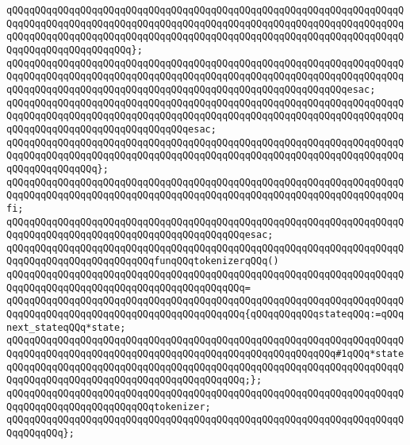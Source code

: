 \verb|qQQqqQQqqQQqqQQqqQQqqQQqqQQqqQQqqQQqqQQqqQQqqQQqqQQqqQQqqQQqqQQqqQQqqQQqqQQqqQQqqQQqqQQqqQQqqQQqqQQqqQQqqQQqqQQqqQQqqQQqqQQqqQQqqQQqqQQqqQQqqQQqqQQqqQQqqQQqqQQqqQQqqQQqqQQqqQQqqQQqqQQqqQQqqQQqqQQqqQQqqQQqqQQqqQQqqQQqqQQqqQQqqQQqqQQq};|\newline
\verb|qQQqqQQqqQQqqQQqqQQqqQQqqQQqqQQqqQQqqQQqqQQqqQQqqQQqqQQqqQQqqQQqqQQqqQQqqQQqqQQqqQQqqQQqqQQqqQQqqQQqqQQqqQQqqQQqqQQqqQQqqQQqqQQqqQQqqQQqqQQqqQQqqQQqqQQqqQQqqQQqqQQqqQQqqQQqqQQqqQQqqQQqqQQqqQQqqQQqqQQqesac;|\newline
\verb|qQQqqQQqqQQqqQQqqQQqqQQqqQQqqQQqqQQqqQQqqQQqqQQqqQQqqQQqqQQqqQQqqQQqqQQqqQQqqQQqqQQqqQQqqQQqqQQqqQQqqQQqqQQqqQQqqQQqqQQqqQQqqQQqqQQqqQQqqQQqqQQqqQQqqQQqqQQqqQQqqQQqqQQqqQQqesac;|\newline
\verb|qQQqqQQqqQQqqQQqqQQqqQQqqQQqqQQqqQQqqQQqqQQqqQQqqQQqqQQqqQQqqQQqqQQqqQQqqQQqqQQqqQQqqQQqqQQqqQQqqQQqqQQqqQQqqQQqqQQqqQQqqQQqqQQqqQQqqQQqqQQqqQQqqQQqqQQqqQQq};|\newline
\verb|qQQqqQQqqQQqqQQqqQQqqQQqqQQqqQQqqQQqqQQqqQQqqQQqqQQqqQQqqQQqqQQqqQQqqQQqqQQqqQQqqQQqqQQqqQQqqQQqqQQqqQQqqQQqqQQqqQQqqQQqqQQqqQQqqQQqqQQqqQQqfi;|\newline
\verb|qQQqqQQqqQQqqQQqqQQqqQQqqQQqqQQqqQQqqQQqqQQqqQQqqQQqqQQqqQQqqQQqqQQqqQQqqQQqqQQqqQQqqQQqqQQqqQQqqQQqqQQqqQQqqQQqesac;|\newline
\newline
\verb|qQQqqQQqqQQqqQQqqQQqqQQqqQQqqQQqqQQqqQQqqQQqqQQqqQQqqQQqqQQqqQQqqQQqqQQqqQQqqQQqqQQqqQQqqQQqqQQqfunqQQqtokenizerqQQq()|\newline
\verb|qQQqqQQqqQQqqQQqqQQqqQQqqQQqqQQqqQQqqQQqqQQqqQQqqQQqqQQqqQQqqQQqqQQqqQQqqQQqqQQqqQQqqQQqqQQqqQQqqQQqqQQqqQQqqQQq=|\newline
\verb|qQQqqQQqqQQqqQQqqQQqqQQqqQQqqQQqqQQqqQQqqQQqqQQqqQQqqQQqqQQqqQQqqQQqqQQqqQQqqQQqqQQqqQQqqQQqqQQqqQQqqQQqqQQqqQQq{qQQqqQQqqQQqstateqQQq:=qQQqnext_stateqQQq*state;|\newline
\verb|qQQqqQQqqQQqqQQqqQQqqQQqqQQqqQQqqQQqqQQqqQQqqQQqqQQqqQQqqQQqqQQqqQQqqQQqqQQqqQQqqQQqqQQqqQQqqQQqqQQqqQQqqQQqqQQqqQQqqQQqqQQqqQQq#1qQQq*state|\newline
\verb|qQQqqQQqqQQqqQQqqQQqqQQqqQQqqQQqqQQqqQQqqQQqqQQqqQQqqQQqqQQqqQQqqQQqqQQqqQQqqQQqqQQqqQQqqQQqqQQqqQQqqQQqqQQqqQQq;};|\newline
\newline
\verb|qQQqqQQqqQQqqQQqqQQqqQQqqQQqqQQqqQQqqQQqqQQqqQQqqQQqqQQqqQQqqQQqqQQqqQQqqQQqqQQqqQQqqQQqqQQqqQQqtokenizer;|\newline
\verb|qQQqqQQqqQQqqQQqqQQqqQQqqQQqqQQqqQQqqQQqqQQqqQQqqQQqqQQqqQQqqQQqqQQqqQQqqQQqqQQq};|\newline
